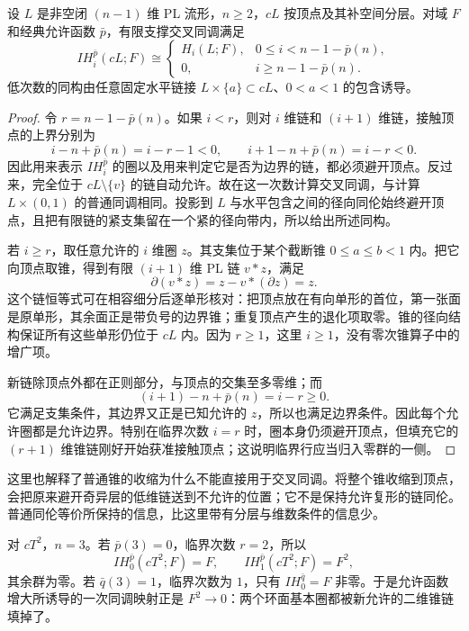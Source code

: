 \begin{theorem}[锥公式]\label{g2:thm:intersection-cone-formula}
	设 \(L\) 是非空闭 \((n-1)\) 维 PL 流形，\(n\ge2\)，\(cL\) 按顶点及其补空间分层。对域 \(F\) 和经典允许函数 \(\bar p\)，有限支撑交叉同调满足
	\begin{equation}\label{g2:eq:intersection-cone-formula}
		IH_i^{\bar p}(cL;F)\cong
		\begin{cases}
			H_i(L;F),&0\le i<n-1-\bar p(n),\\
			0,&i\ge n-1-\bar p(n).
		\end{cases}
	\end{equation}
	低次数的同构由任意固定水平链接 \(L\times\{a\}\subset cL\)、\(0<a<1\) 的包含诱导。
\end{theorem}
\begin{proof}
	令 \(r=n-1-\bar p(n)\)。如果 \(i<r\)，则对 \(i\) 维链和 \((i+1)\) 维链，接触顶点的上界分别为
	\[
		i-n+\bar p(n)=i-r-1<0,
		\qquad i+1-n+\bar p(n)=i-r<0.
	\]
	因此用来表示 \(IH_i^{\bar p}\) 的圈以及用来判定它是否为边界的链，都必须避开顶点。反过来，完全位于 \(cL\setminus\{v\}\) 的链自动允许。故在这一次数计算交叉同调，与计算 \(L\times(0,1)\) 的普通同调相同。投影到 \(L\) 与水平包含之间的径向同伦始终避开顶点，且把有限链的紧支集留在一个紧的径向带内，所以给出所述同构。

	若 \(i\ge r\)，取任意允许的 \(i\) 维圈 \(z\)。其支集位于某个截断锥 \(0\le a\le b<1\) 内。把它向顶点取锥，得到有限 \((i+1)\) 维 PL 链 \(v*z\)，满足
	\[
		\partial(v*z)=z-v*(\partial z)=z.
	\]
	这个链恒等式可在相容细分后逐单形核对：把顶点放在有向单形的首位，第一张面是原单形，其余面正是带负号的边界锥；重复顶点产生的退化项取零。锥的径向结构保证所有这些单形仍位于 \(cL\) 内。因为 \(r\ge1\)，这里 \(i\ge1\)，没有零次锥算子中的增广项。

	新链除顶点外都在正则部分，与顶点的交集至多零维；而
	\[
		(i+1)-n+\bar p(n)=i-r\ge0.
	\]
	它满足支集条件，其边界又正是已知允许的 \(z\)，所以也满足边界条件。因此每个允许圈都是允许边界。特别在临界次数 \(i=r\) 时，圈本身仍须避开顶点，但填充它的 \((r+1)\) 维锥链刚好开始获准接触顶点；这说明临界行应当归入零群的一侧。
\end{proof}

这里也解释了普通锥的收缩为什么不能直接用于交叉同调。将整个锥收缩到顶点，会把原来避开奇异层的低维链送到不允许的位置；它不是保持允许复形的链同伦。普通同伦等价所保持的信息，比这里带有分层与维数条件的信息少。

\begin{example}\label{g2:exm:cone-torus-intersection}
	对 \(cT^2\)，\(n=3\)。若 \(\bar p(3)=0\)，临界次数 \(r=2\)，所以
	\[
		IH_0^{\bar p}(cT^2;F)=F,\qquad
		IH_1^{\bar p}(cT^2;F)=F^2,
	\]
	其余群为零。若 \(\bar q(3)=1\)，临界次数为 \(1\)，只有 \(IH_0^{\bar q}=F\) 非零。于是允许函数增大所诱导的一次同调映射正是 \(F^2\to0\)：两个环面基本圈都被新允许的二维锥链填掉了。
\end{example}

